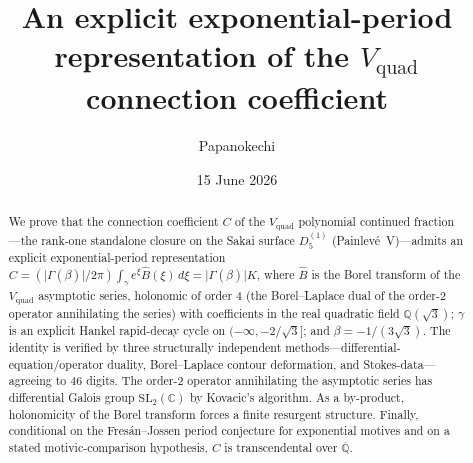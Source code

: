 \documentclass[11pt,reqno]{amsart}
\title[An exponential-period representation of the $V_{\mathrm{quad}}$ constant]%
{An explicit exponential-period representation of the $V_{\mathrm{quad}}$ connection coefficient}
\author{Papanokechi}
\date{15 June 2026}
\theoremstyle{plain}
\theoremstyle{definition}
\newcommand{\Vquad}{V_{\mathrm{quad}}}
\newcommand{\Bhat}{\widehat{B}}
\newcommand{\Qsqrt}{\mathbb{Q}(\sqrt3)}
\newcommand{\Qbar}{\overline{\mathbb{Q}}}
\newcommand{\SL}{\mathrm{SL}}
\begin{document}
\begin{abstract}
We prove that the connection coefficient $C$ of the $\Vquad$ polynomial continued fraction---the
rank-one standalone closure on the Sakai surface $D_5^{(1)}$ (Painlev\'e~V)---admits an explicit
exponential-period representation
$C=(\lvert\Gamma(\beta)\rvert/2\pi)\int_\gamma e^{\xi}\Bhat(\xi)\,d\xi=\lvert\Gamma(\beta)\rvert K$,
where $\Bhat$ is the Borel transform of the $\Vquad$ asymptotic series, holonomic of order $4$
(the Borel--Laplace dual of the order-$2$ operator annihilating the series)
with coefficients in the real quadratic field $\Qsqrt$; $\gamma$ is an explicit Hankel
rapid-decay cycle on $(-\infty,-2/\sqrt3]$; and $\beta=-1/(3\sqrt3)$. The identity is verified by
three structurally independent methods---differential-equation/operator duality, Borel--Laplace
contour deformation, and Stokes-data---agreeing to $46$ digits. The order-$2$ operator annihilating
the asymptotic series has differential Galois group $\SL_2(\mathbb{C})$ by Kovacic's algorithm.
As a by-product, holonomicity of the Borel transform forces a finite resurgent structure. Finally,
conditional on the Fres\'an--Jossen period conjecture for exponential motives and on a stated
motivic-comparison hypothesis, $C$ is transcendental over $\Qbar$.
\end{abstract}
\maketitle
\end{document}
